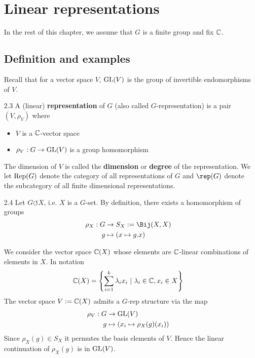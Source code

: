 \documentclass[twoside = false,	%
		headsepline,		%
		parskip = true,
		]{scrbook}						%
\begin{document}
\section{Linear representations}
    In the rest of this chapter, we assume that $G$ is a finite group and fix $\mathbb C$.
    
    \subsection{Definition and examples}
        Recall that for a vector space $V$, $\mathrm{GL}(V)$ is the group of invertible endomorphisms of $V$.
        \begin{definition}{}{2.3}
            A (linear) \textbf{representation} of $G$ (also called $G$-representation) is a pair $(V,\rho_V)$ where
            \begin{itemize}
                \item $V$ is a $\mathbb C$-vector space
                \item $\rho_V: G \to \mathrm{GL}(V)$ is a group homomorphism
            \end{itemize}
            
            The dimension of $V$ is called the \textbf{dimension} or \textbf{degree} of the representation. We let $\mathrm{Rep}(G)$ denote the category of all representations of $G$ and $\rep(G)$ denote the subcategory of all finite dimensional representations.
        \end{definition}
        
        \begin{example}{}{2.4}
            Let $G \circlearrowleft X$, i.e. $X$ is a $G$-set. By definition, there exists a homomorphism of groups
            \begin{equation*}
            \begin{split}
                \rho_X: G &\to S_X:=\Bij(X,X) \\
                        g &\mapsto (x \mapsto g.x)
            \end{split}
            \end{equation*}
            
            We consider the vector space $\mathbb C(X)$ whose elements are $\mathbb C$-linear combinations of elements in $X$. In notation
            \begin{equation*}
                \mathbb C(X) = \left\{\sum_{i=1}^{k} \lambda_i x_i \ | \ \lambda_i \in \mathbb C, x_i \in X \right\}
            \end{equation*}
            The vector space $V:= \mathbb C(X)$ admits a $G$-rep structure via the map
            \begin{equation*}
            \begin{split}
                \rho_V: G &\to \mathrm{GL}(V) \\
                    g &\mapsto \left(x_i \mapsto \rho_X(g)(x_i)\right)
            \end{split}
            \end{equation*}
            Since $\rho_X(g) \in S_X$ it permutes the basis elements of $V$. Hence the linear continuation of $\rho_X(g)$ is in $\mathrm{GL}(V)$.
        \end{example}
        
\end{document}
